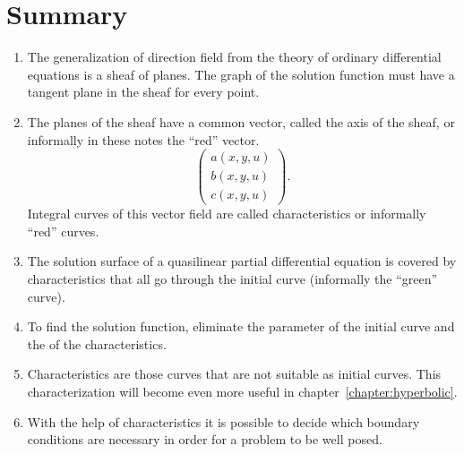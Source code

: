 \section{Summary}
\begin{enumerate}
\item
The generalization of direction field from the theory of ordinary
differential equations is a sheaf of planes.
The graph of the solution function must have a tangent plane in the 
sheaf for every point.
\item
The planes of the sheaf have a common vector, called the axis of the sheaf,
or informally in these notes the ``red'' vector.
\[
\begin{pmatrix}
a(x,y,u)\\
b(x,y,u)\\
c(x,y,u)
\end{pmatrix}.
\]
Integral curves of this vector field are called characteristics
or informally ``red'' curves.
\item
The solution surface of a quasilinear partial differential equation
is covered by characteristics that all go through the initial curve
(informally the ``green'' curve).
\item
To find the solution function, eliminate the parameter of the initial
curve and the of the characteristics.
\item
Characteristics are those curves that are not suitable as initial
curves.
This characterization will become even more useful in
chapter~\ref{chapter:hyperbolic}.
\item
With the help of characteristics it is possible to decide which boundary
conditions are necessary in order for a problem to be well posed.
\end{enumerate}

